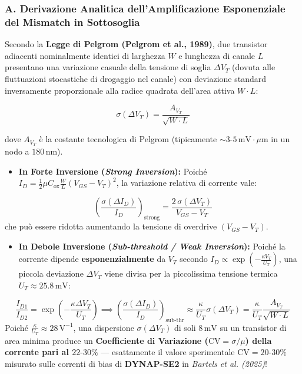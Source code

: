 \documentclass[11pt,a4paper]{article}
\begin{document}
\subsubsection{A. Derivazione Analitica dell'Amplificazione Esponenziale del Mismatch in Sottosoglia}
Secondo la \textbf{Legge di Pelgrom (Pelgrom et al., 1989)}, due transistor adiacenti nominalmente identici di larghezza $W$ e lunghezza di canale $L$ presentano una variazione casuale della tensione di soglia $\Delta V_T$ (dovuta alle fluttuazioni stocastiche di drogaggio nel canale) con deviazione standard inversamente proporzionale alla radice quadrata dell'area attiva $W \cdot L$:

\[
\sigma(\Delta V_T) = \frac{A_{V_T}}{\sqrt{W \cdot L}}
\]

dove $A_{V_T}$ è la costante tecnologica di Pelgrom (tipicamente $\sim 3\text{-}5\,\text{mV}\cdot\mu\text{m}$ in un nodo a $180\,\text{nm}$).
\begin{itemize}
  \item \textbf{In Forte Inversione (\textit{Strong Inversion}):} Poiché $I_D = \frac{1}{2}\mu C_{\text{ox}}\frac{W}{L}(V_{GS} - V_T)^2$, la variazione relativa di corrente vale:
\end{itemize}
\[
\left(\frac{\sigma(\Delta I_D)}{I_D}\right)_{\text{strong}} = \frac{2 \, \sigma(\Delta V_T)}{V_{GS} - V_T}
\]
che può essere ridotta aumentando la tensione di overdrive $(V_{GS} - V_T)$.
\begin{itemize}
  \item \textbf{In Debole Inversione (\textit{Sub-threshold / Weak Inversion}):} Poiché la corrente dipende \textbf{esponenzialmente} da $V_T$ secondo $I_D \propto \exp\left(-\frac{\kappa V_T}{U_T}\right)$, una piccola deviazione $\Delta V_T$ viene divisa per la piccolissima tensione termica $U_T \approx 25.8\,\text{mV}$:
\end{itemize}
\[
\frac{I_{D1}}{I_{D2}} = \exp\left(-\frac{\kappa \Delta V_T}{U_T}\right) \implies \left(\frac{\sigma(\Delta I_D)}{I_D}\right)_{\text{sub-thr}} \approx \frac{\kappa}{U_T} \sigma(\Delta V_T) = \frac{\kappa}{U_T} \frac{A_{V_T}}{\sqrt{W \cdot L}}
\]
Poiché $\frac{\kappa}{U_T} \approx 28\,\text{V}^{-1}$, una dispersione $\sigma(\Delta V_T)$ di soli $8\,\text{mV}$ su un transistor di area minima produce un \textbf{Coefficiente di Variazione ($\text{CV} = \sigma/\mu$) della corrente pari al $22\text{-}30\%$} --- esattamente il valore sperimentale \textbf{$\text{CV} = 20\text{-}30\%$} misurato sulle correnti di bias di \textbf{DYNAP-SE2} in \textit{Bartels et al. (2025)}!
\end{document}
